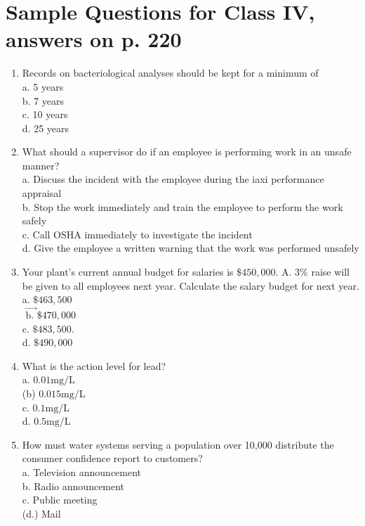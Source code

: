 \documentclass[10pt]{article}
\begin{document}
\section{Sample Questions for Class IV, answers on p. 220}
\begin{enumerate}
  \item Records on bacteriological analyses should be kept for a minimum of\\
a. 5 years\\
b. 7 years\\
c. 10 years\\
d. 25 years

  \item What should a supervisor do if an employee is performing work in an unsafe manner?\\
a. Discuss the incident with the employee during the iaxi performance appraisal\\
b. Stop the work immediately and train the employee to perform the work safely\\
c. Call OSHA immediately to investigate the incident\\
d. Give the employee a written warning that the work was performed unsafely

  \item Your plant's current annual budget for salaries is $\$ 450,000$. A. $3 \%$ raise will be given to all employees next year. Calculate the salary budget for next year.\\
a. $\$ 463,500$\\
$\overrightarrow{\text { b. }} \$ 470,000$\\
c. $\$ 483,500$.\\
d. $\$ 490,000$

  \item What is the action level for lead?\\
a. $0.01 \mathrm{mg} / \mathrm{L}$\\
(b) $0.015 \mathrm{mg} / \mathrm{L}$\\
c. $0.1 \mathrm{mg} / \mathrm{L}$\\
d. $0.5 \mathrm{mg} / \mathrm{L}$

  \item How must water systems serving a population over 10,000 distribute the consumer confidence report to customers?\\
a. Television announcement\\
b. Radio announcement\\
c. Public meeting\\
(d.) Mail

\end{enumerate}
\end{document}
